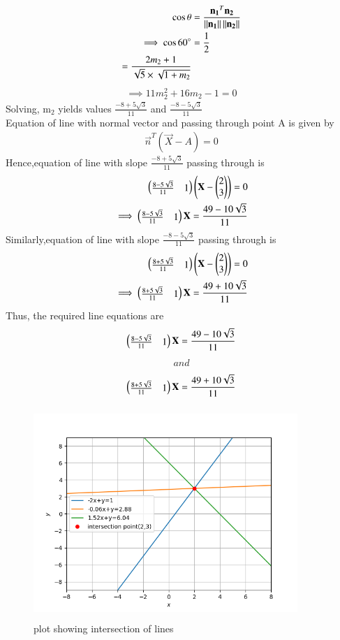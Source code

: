 \documentclass[journal,12pt,twocolumn]{IEEEtran}
\begin{document}
\begin{align}
\cos \theta &= \frac{\mathbf{n_1}^T\mathbf{n_2}}{\left\lVert\mathbf{n_1}\right\rVert\left\lVert\mathbf{n_2}\right\rVert}\\
\implies \cos 60\degree &=\frac{1}{2}\\ 
=\frac{2m_2+1}{\sqrt5\times\sqrt{1+m_2}}
\end{align}
 \begin{align}
 \implies 11m_2^2+16m_2-1=0
 \end{align}
 Solving, m$_2$ yields values $\frac{-8+5\sqrt{3}}{11}$ and $\frac{-8-5\sqrt{3}}{11}$ \\
 Equation of line with normal vector and passing through point A is given by
 \begin{align}
 \vec{n}^T(\vec{X}-A)=0
 \end{align}
  Hence,equation of line with slope $\frac{-8+5\sqrt{3}}{11}$ passing through  is
  \begin{align}
  \begin{pmatrix}\frac{8-5\sqrt{3}}{11}&1\end{pmatrix}\left(\mathbf{X}-\begin{pmatrix}2\\3\end{pmatrix}\right)=0\\
  \implies \begin{pmatrix}\frac{8-5\sqrt{3}}{11}&1\end{pmatrix}\mathbf{X}=\frac{49-10\sqrt{3}}{11}
  \end{align}
  Similarly,equation of line with slope $\frac{-8-5\sqrt{3}}{11}$ passing through  is
  \begin{align}
  \begin{pmatrix}\frac{8+5\sqrt{3}}{11}&1\end{pmatrix}\left(\mathbf{X}-\begin{pmatrix}2\\3\end{pmatrix}\right)=0\\
  \implies \begin{pmatrix}\frac{8+5\sqrt{3}}{11}&1\end{pmatrix}\mathbf{X}=\frac{49+10\sqrt{3}}{11}
  \end{align}
  Thus, the required line equations are
  \begin{align}
  \begin{pmatrix}\frac{8-5\sqrt{3}}{11}&1\end{pmatrix}\mathbf{X}=\frac{49-10\sqrt{3}}{11} 
  \end{align}
  \begin{align}
  and
  \end{align}
  \begin{align}
   \begin{pmatrix}\frac{8+5\sqrt{3}}{11}&1\end{pmatrix}\mathbf{X}=\frac{49+10\sqrt{3}}{11}
  \end{align}
  \newpage
\begin{figure}[!ht]
\centering
\includegraphics[width=10cm, height=8cm]{plot.png}
\caption{plot showing intersection of lines}
\label{Fig4}
\end{figure}
\end{document}
